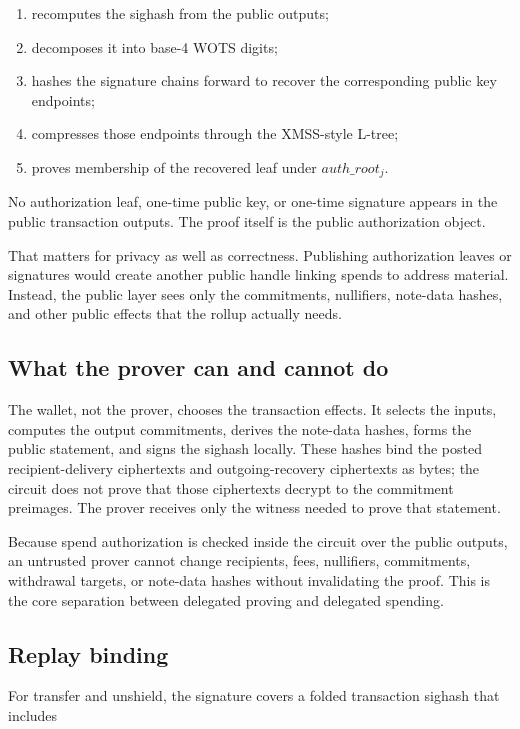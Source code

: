 \documentclass[11pt]{article}
\begin{document}
\begin{enumerate}
  \item recomputes the sighash from the public outputs;
  \item decomposes it into base-4 WOTS digits;
  \item hashes the signature chains forward to recover the corresponding public
        key endpoints;
  \item compresses those endpoints through the XMSS-style L-tree;
  \item proves membership of the recovered leaf under \(auth\_root_j\).
\end{enumerate}

No authorization leaf, one-time public key, or one-time signature appears in the
public transaction outputs. The proof itself is the public authorization object.

That matters for privacy as well as correctness. Publishing authorization leaves
or signatures would create another public handle linking spends to address
material. Instead, the public layer sees only the commitments, nullifiers,
note-data hashes, and other public effects that the rollup actually needs.

\subsection{What the prover can and cannot do}

The wallet, not the prover, chooses the transaction effects. It selects the
inputs, computes the output commitments, derives the note-data hashes, forms
the public statement, and signs the sighash locally. These hashes bind the
posted recipient-delivery ciphertexts and outgoing-recovery ciphertexts as
bytes; the circuit does not prove that those ciphertexts decrypt to the
commitment preimages. The prover receives only the witness needed to prove that
statement.

Because spend authorization is checked inside the circuit over the public
outputs, an untrusted prover cannot change recipients, fees, nullifiers,
commitments, withdrawal targets, or note-data hashes without invalidating the
proof. This is the core separation between delegated proving and delegated
spending.

\subsection{Replay binding}

For transfer and unshield, the signature covers a folded transaction sighash
that includes
\end{document}
